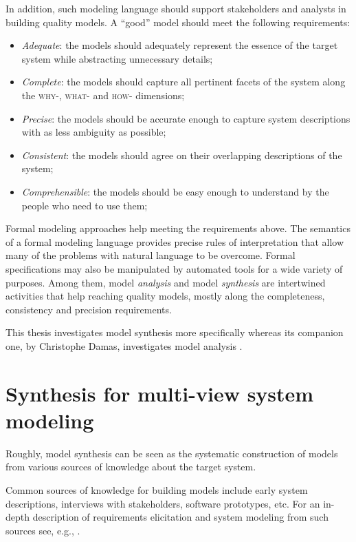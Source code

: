 In addition, such modeling language should support stakeholders and analysts in building quality models. A ``good'' model should meet the following requirements:

\begin{itemize}
\item \emph{Adequate}: the models should adequately represent the essence of the target system while abstracting unnecessary details;
\item \emph{Complete}: the models should capture all pertinent facets of the system along the \textsc{why-}, \textsc{what-} and \textsc{how-} dimensions;
\item \emph{Precise}: the models should be accurate enough to capture system descriptions with as less ambiguity as possible;
\item \emph{Consistent}: the models should agree on their overlapping descriptions of the system;
\item \emph{Comprehensible}: the models should be easy enough to understand by the people who need to use them;
\end{itemize}

Formal modeling approaches help meeting the requirements above. The semantics of a formal modeling language provides precise rules of interpretation that allow many of the problems with natural language to be overcome. Formal specifications may also be manipulated by automated tools for a wide variety of purposes. Among them, model \emph{analysis} and model \emph{synthesis} are intertwined activities that help reaching quality models, mostly along the completeness, consistency and precision requirements.

This thesis investigates model synthesis more specifically whereas its companion one, by Christophe Damas, investigates model analysis \cite{Damas:2011}.

\section{Synthesis for multi-view system modeling}

Roughly, model synthesis can be seen as the systematic construction of models from various sources of knowledge about the target system. 

Common sources of knowledge for building models include early system descriptions, interviews with stakeholders, software prototypes, etc. For an in-depth description of requirements elicitation and system modeling from such sources see, e.g., \cite{VanLamsweerde:2009}.

